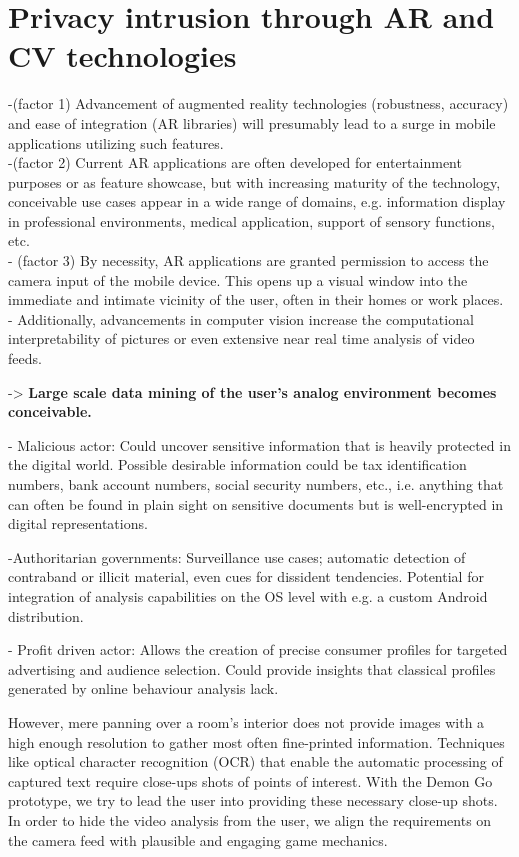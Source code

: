
\section{Privacy intrusion through AR and CV technologies}

-(factor 1) Advancement of augmented reality technologies (robustness, accuracy) and ease of integration (AR libraries) will presumably lead to a surge in mobile applications utilizing such features. \\
-(factor 2) Current AR applications are often developed for entertainment purposes or as feature showcase, but with increasing maturity of the technology, conceivable use cases appear in a wide range of domains, e.g. information display in professional environments, medical application, support of sensory functions, etc. \\
- (factor 3) By necessity, AR applications are granted permission to access the camera input of the mobile device. This opens up a visual window into the immediate and intimate vicinity of the user, often in their homes or work places. \\
- Additionally, advancements in computer vision increase the computational interpretability of pictures or even extensive near real time analysis of video feeds.

-> \textbf{Large scale data mining of the user's analog environment becomes  conceivable.}

- Malicious actor: Could uncover sensitive information that is heavily protected in the digital world.
Possible desirable information could be tax identification numbers, bank account numbers, social security numbers, etc., i.e. anything that can often be found in plain sight on sensitive documents but is well-encrypted in digital representations.

-Authoritarian governments: Surveillance use cases; automatic detection of contraband or illicit material, even cues for dissident tendencies. Potential for integration of analysis capabilities on the OS level with e.g. a custom Android distribution.

- Profit driven actor: Allows the creation of precise consumer profiles for targeted advertising and audience selection. Could provide insights that classical profiles generated by online behaviour analysis lack.

However, mere panning over a room's interior does not provide images with a high enough resolution to gather most often fine-printed information.
Techniques like optical character recognition (OCR) that enable the automatic processing of captured text require close-ups shots of points of interest.
With the Demon Go prototype, we try to lead the user into providing these necessary close-up shots.
In order to hide the video analysis from the user, we align the requirements on the camera feed with plausible and engaging game mechanics.

